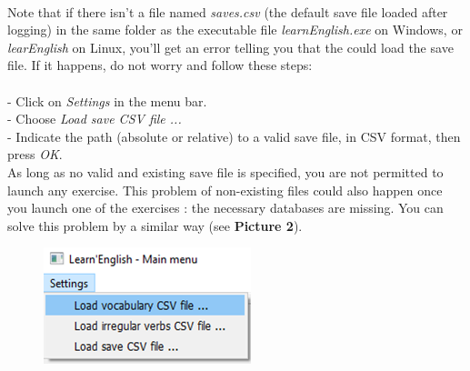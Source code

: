 \documentclass[12pt, a4paper]{report}
\begin{document}
\paragraph{}Note that if there isn't a file named \textit{saves.csv} (the default save file loaded after logging)  in the same folder as the executable file \textit{learnEnglish.exe} on Windows, or \textit{learEnglish} on Linux, you'll get an error telling you that the could load the save file. If it happens, do not worry and follow these steps:\\
\\
\hspace*{0.5cm}- Click on \textit{Settings} in the menu bar.\\
\hspace*{0.5cm}- Choose \textit{Load save CSV file ...}\\
\hspace*{0.5cm}- Indicate the path (absolute or relative) to a valid save file, in CSV format, then press \textit{OK}.\\
As long as no valid and existing save file is specified, you are not permitted to launch any exercise. This problem of non-existing files could also happen once you launch one of the exercises : the necessary databases are missing. You can solve this problem by a similar way (see \textbf{Picture 2}).

\begin{figure}[H]
    \centering
    \includegraphics[scale=0.70]{images/menu.png}
\end{figure}
\end{document}
